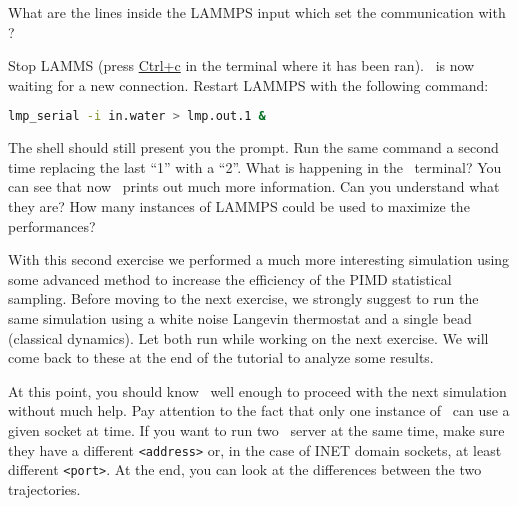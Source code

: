 \documentclass{article}
\begin{document}
\begin{Exercise}[label={inputs},title={Liquid water with the
    \emph{PIGLET} thermostat}]
What are the lines inside the LAMMPS input which set the communication
with \ipi ?

\Question
Stop LAMMS (press \url{Ctrl+c} in the terminal where it has been
ran). \ipi\ is now waiting for a new connection. Restart LAMMPS with
the following command:
\begin{lstlisting}[language=bash]
lmp_serial -i in.water > lmp.out.1 &
\end{lstlisting}
The shell should still present you the prompt. Run the same command a
second time replacing the last ``1'' with a ``2''. What is happening
in the \ipi\ terminal? You can see that now \ipi\ prints out much more
information. Can you understand what they are? How many instances of
LAMMPS could be used to maximize the performances?

\end{Exercise}

With this second exercise we performed a much more interesting
simulation using some advanced method to increase the efficiency of
the PIMD statistical sampling. Before moving to the next exercise, we
strongly suggest to run the same simulation using a white noise Langevin
thermostat and a single bead (classical dynamics).  Let both run while
working on the next exercise. We will come back to these at the end of
the tutorial to analyze some results.

At this point, you should know \ipi\ well enough to
proceed with the next simulation without much help. Pay attention to
the fact that only one instance of \ipi\ can use a given socket at
time. If you want to run two \ipi\ server at the same time, make sure
they have a different \texttt{<address>} or, in the case of INET domain
sockets, at least different \texttt{<port>}. At the end, you can look
at the differences between the two trajectories.

\vspace{2em}
\end{document}
